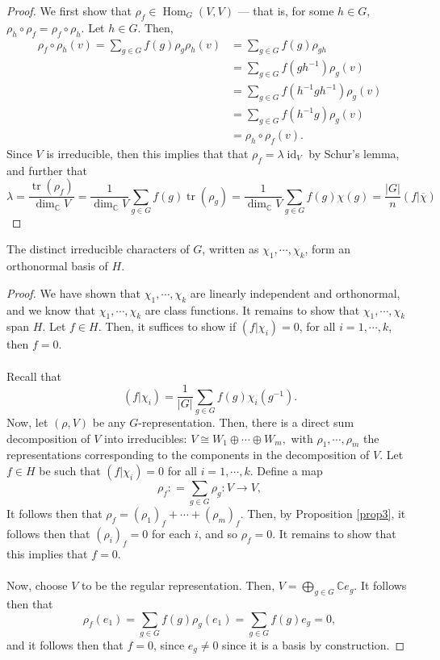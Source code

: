 \documentclass[a4paper]{report}
\theoremstyle{definition}
\theoremstyle{remark}
\theoremstyle{proposition}
\theoremstyle{conjecture}
\theoremstyle{lemma}
\theoremstyle{corollary}
\theoremstyle{exercise}
\theoremstyle{example}
\newcommand{\C}{\mathbb{C}}
\newcommand{\on}{\operatorname}
\begin{document}
\begin{proof}
    We first show that $\rho_f \in \on{Hom}_G(V,V)$ --- that is, 
    for some $h \in G$, $\rho_h\circ \rho_f = \rho_f \circ \rho_h$.
    Let $h \in G$. Then, 
    \begin{align*}
            \rho_f \circ \rho_h (v) = \sum_{g \in G} f(g) \rho_g\rho_h(v) &= \sum_{g \in G} f(g) \rho_{gh}\\ &= \sum_{g \in G} f(gh^{-1}) \rho_g(v)\\ 
                                                                          &= \sum_{g \in G} f(h^{-1}gh^{-1})\rho_g(v)\\ &= \sum_{g\in G} f(h^{-1}g)\rho_g(v)\\ 
                                                                          &= \rho_h \circ \rho_f(v).
\end{align*} 
    Since $V$ is irreducible, then this implies that that 
    $\rho_f = \lambda \on{id}_V$ by Schur's lemma, and further that 
    $$\lambda = \frac{\on{tr}(\rho_f)}{\dim_\C V} =\frac{1}{\dim_\C V} \sum_{g \in G}f(g)\on{tr}(\rho_g) = \frac{1}{\dim_\C V}\sum_{g \in G}f(g)\chi(g) = \frac{\vert G\vert}{n} (f\vert \overline{\chi})$$
\end{proof}

\begin{theorem}\label{thm_chars_forms_basis}
    The distinct irreducible characters of $G$, written as 
    $\chi_1,\cdots,\chi_k$, form an orthonormal basis of $H$.
\end{theorem}

\begin{proof}
    We have shown that $\chi_1,\cdots,\chi_k$ are linearly independent and 
    orthonormal, and we know that $\chi_1,\cdots,\chi_k$ are class functions. 
    It remains to show that $\chi_1,\cdots,\chi_k$ span $H$.
    Let $f\in H$. Then, it suffices to show if 
    $(f\vert \chi_i) = 0$, for all $i=1,\cdots,k$, then $f = 0$. \\\\
    Recall that 
    $$(f\vert\chi_i) = \frac{1}{\vert G \vert} \sum_{g \in G} f(g)\chi_i(g^{-1}).$$
    Now, let $(\rho,V)$ be any $G$-representation. Then, there is a direct sum
    decomposition of $V$ into irreducibles:
    $V \cong W_1\oplus\cdots\oplus W_m,$ with $\rho_1,\cdots,\rho_m$ the 
    representations corresponding to the components in the decomposition
    of $V$. Let $f \in H$ be such that $(f\vert\chi_i) = 0$ for all
    $i=1,\cdots,k$. Define a map 
    $$\rho_f : = \sum_{g\in G}\rho_g : V \to V,$$
    It follows then that $\rho_f = (\rho_1)_f + \cdots + (\rho_m)_f$. 
    Then, by Proposition 
    \ref{prop3}, it follows then that $(\rho_i)_f = 0$ for each $i$, and so 
    $\rho_f = 0$. It remains to show that this implies that $f = 0$.\\\\
    Now, choose $V$ to be the regular representation. Then, 
    $V = \bigoplus_{g\in G}\C e_g$. It follows then that 
    $$\rho_f(e_1) = \sum_{g\in G} f(g) \rho_g(e_1) = \sum_{g\in G} f(g)e_g = 0,$$
    and it follows then that $f =0$, since $e_g \neq 0$ since it is a basis 
    by construction.
\end{proof}
\end{document}
